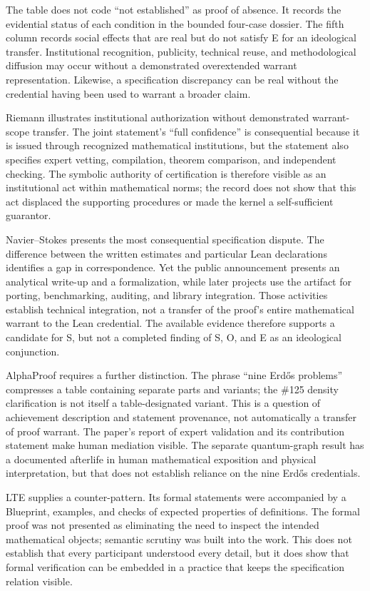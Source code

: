 \documentclass[sn-apa]{sn-jnl}
\begin{document}
The table does not code “not established” as proof of absence. It records the evidential status of each condition in the bounded four-case dossier. The fifth column records social effects that are real but do not satisfy E for an ideological transfer. Institutional recognition, publicity, technical reuse, and methodological diffusion may occur without a demonstrated overextended warrant representation. Likewise, a specification discrepancy can be real without the credential having been used to warrant a broader claim.

Riemann illustrates institutional authorization without demonstrated warrant-scope transfer. The joint statement’s “full confidence” is consequential because it is issued through recognized mathematical institutions, but the statement also specifies expert vetting, compilation, theorem comparison, and independent checking. The symbolic authority of certification is therefore visible as an institutional act within mathematical norms; the record does not show that this act displaced the supporting procedures or made the kernel a self-sufficient guarantor.

Navier–Stokes presents the most consequential specification dispute. The difference between the written estimates and particular Lean declarations identifies a gap in correspondence. Yet the public announcement presents an analytical write-up and a formalization, while later projects use the artifact for porting, benchmarking, auditing, and library integration. Those activities establish technical integration, not a transfer of the proof’s entire mathematical warrant to the Lean credential. The available evidence therefore supports a candidate for S, but not a completed finding of S, O, and E as an ideological conjunction.

AlphaProof requires a further distinction. The phrase “nine Erdős problems” compresses a table containing separate parts and variants; the \#125 density clarification is not itself a table-designated variant. This is a question of achievement description and statement provenance, not automatically a transfer of proof warrant. The paper’s report of expert validation and its contribution statement make human mediation visible. The separate quantum-graph result has a documented afterlife in human mathematical exposition and physical interpretation, but that does not establish reliance on the nine Erdős credentials.

LTE supplies a counter-pattern. Its formal statements were accompanied by a Blueprint, examples, and checks of expected properties of definitions. The formal proof was not presented as eliminating the need to inspect the intended mathematical objects; semantic scrutiny was built into the work. This does not establish that every participant understood every detail, but it does show that formal verification can be embedded in a practice that keeps the specification relation visible.
\end{document}
